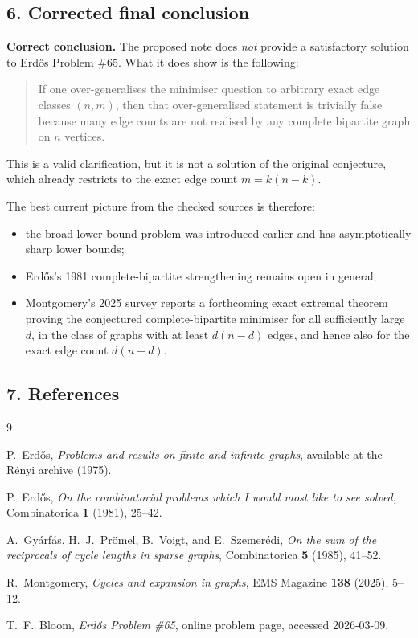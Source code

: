 \subsection*{6. Corrected final conclusion}

\textbf{Correct conclusion.}
The proposed note does \emph{not} provide a satisfactory solution to Erd\H{o}s Problem \#65. What it does show is the following:
\begin{quote}
If one over-generalises the minimiser question to arbitrary exact edge classes $(n,m)$, then that over-generalised statement is trivially false because many edge counts are not realised by any complete bipartite graph on $n$ vertices.
\end{quote}
This is a valid clarification, but it is not a solution of the original conjecture, which already restricts to the exact edge count $m=k(n-k)$.

The best current picture from the checked sources is therefore:
\begin{itemize}
\item the broad lower-bound problem was introduced earlier and has asymptotically sharp lower bounds;
\item Erd\H{o}s's 1981 complete-bipartite strengthening remains open in general;
\item Montgomery's 2025 survey reports a forthcoming exact extremal theorem proving the conjectured complete-bipartite minimiser for all sufficiently large $d$, in the class of graphs with at least $d(n-d)$ edges, and hence also for the exact edge count $d(n-d)$.
\end{itemize}

\subsection*{7. References}

\begin{thebibliography}{9}

P.~Erd\H{o}s,
\emph{Problems and results on finite and infinite graphs},
available at the R\'enyi archive (1975).

P.~Erd\H{o}s,
\emph{On the combinatorial problems which I would most like to see solved},
Combinatorica \textbf{1} (1981), 25--42.

A.~Gy\'arf\'as, H.~J.~Pr\"omel, B.~Voigt, and E.~Szemer\'edi,
\emph{On the sum of the reciprocals of cycle lengths in sparse graphs},
Combinatorica \textbf{5} (1985), 41--52.

R.~Montgomery,
\emph{Cycles and expansion in graphs},
EMS Magazine \textbf{138} (2025), 5--12.

T.~F.~Bloom,
\emph{Erd\H{o}s Problem \#65}, online problem page, accessed 2026-03-09.

\end{thebibliography}
